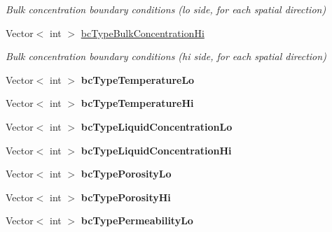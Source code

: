 \begin{DoxyCompactItemize}
\begin{DoxyCompactList}\small\item\em Bulk concentration boundary conditions (lo side, for each spatial direction) \end{DoxyCompactList}\item 
\hypertarget{class_mushy_layer_params_a368d1490a15b2c3ee6e62cb0aff82b5e}{Vector$<$ int $>$ \hyperlink{class_mushy_layer_params_a368d1490a15b2c3ee6e62cb0aff82b5e}{bc\-Type\-Bulk\-Concentration\-Hi}}\label{class_mushy_layer_params_a368d1490a15b2c3ee6e62cb0aff82b5e}

\begin{DoxyCompactList}\small\item\em Bulk concentration boundary conditions (hi side, for each spatial direction) \end{DoxyCompactList}\item 
\hypertarget{class_mushy_layer_params_aa6d0b74290e73410c2fb7eda2bb2efa5}{Vector$<$ int $>$ {\bfseries bc\-Type\-Temperature\-Lo}}\label{class_mushy_layer_params_aa6d0b74290e73410c2fb7eda2bb2efa5}

\item 
\hypertarget{class_mushy_layer_params_a8862878c5d545a228a100fb6ef527cc9}{Vector$<$ int $>$ {\bfseries bc\-Type\-Temperature\-Hi}}\label{class_mushy_layer_params_a8862878c5d545a228a100fb6ef527cc9}

\item 
\hypertarget{class_mushy_layer_params_a14ab801e982911620a5367a5a19091a2}{Vector$<$ int $>$ {\bfseries bc\-Type\-Liquid\-Concentration\-Lo}}\label{class_mushy_layer_params_a14ab801e982911620a5367a5a19091a2}

\item 
\hypertarget{class_mushy_layer_params_a7ef4f85d8b31359cb3a4bab15333a885}{Vector$<$ int $>$ {\bfseries bc\-Type\-Liquid\-Concentration\-Hi}}\label{class_mushy_layer_params_a7ef4f85d8b31359cb3a4bab15333a885}

\item 
\hypertarget{class_mushy_layer_params_a32e3ba5dee5c413aabdbd237b10665c6}{Vector$<$ int $>$ {\bfseries bc\-Type\-Porosity\-Lo}}\label{class_mushy_layer_params_a32e3ba5dee5c413aabdbd237b10665c6}

\item 
\hypertarget{class_mushy_layer_params_a0c21268e365bffc758882f01ca67bc7f}{Vector$<$ int $>$ {\bfseries bc\-Type\-Porosity\-Hi}}\label{class_mushy_layer_params_a0c21268e365bffc758882f01ca67bc7f}

\item 
\hypertarget{class_mushy_layer_params_a4b8ab639d783fa87bfe65eaddc2386b1}{Vector$<$ int $>$ {\bfseries bc\-Type\-Permeability\-Lo}}\label{class_mushy_layer_params_a4b8ab639d783fa87bfe65eaddc2386b1}


\end{DoxyCompactItemize}
